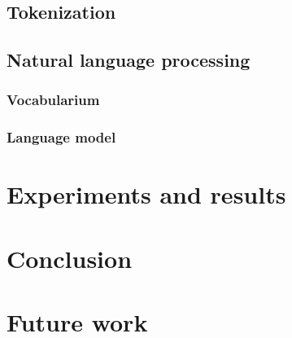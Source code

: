 \documentclass{article}
\begin{document}
\subsection{Tokenization}

\subsection{Natural language processing}

\subsubsection{Vocabularium}
\subsubsection{Language model}

\section{Experiments and results}
\label{sec:expres}
\section{Conclusion}

\section{Future work}



\end{document}
